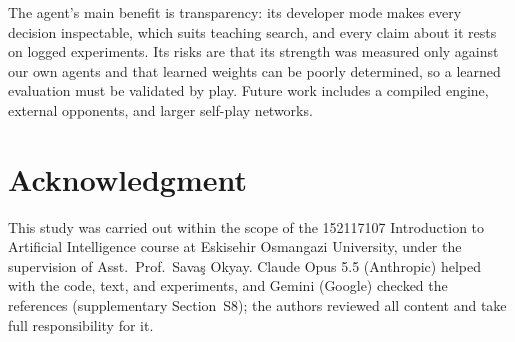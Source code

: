 \documentclass[conference,a4paper]{IEEEtran}
\begin{document}
The agent's main benefit is transparency: its developer mode makes every decision inspectable, which suits teaching search, and every claim about it rests on logged experiments. Its risks are that its strength was measured only against our own agents and that learned weights can be poorly determined, so a learned evaluation must be validated by play. Future work includes a compiled engine, external opponents, and larger self-play networks.

\section*{Acknowledgment}
This study was carried out within the scope of the 152117107 Introduction to Artificial Intelligence course at Eskisehir Osmangazi University, under the supervision of Asst.~Prof.~Savaş Okyay. Claude Opus 5.5 (Anthropic) helped with the code, text, and experiments, and Gemini (Google) checked the references (supplementary Section~S8); the authors reviewed all content and take full responsibility for it.



\end{document}
